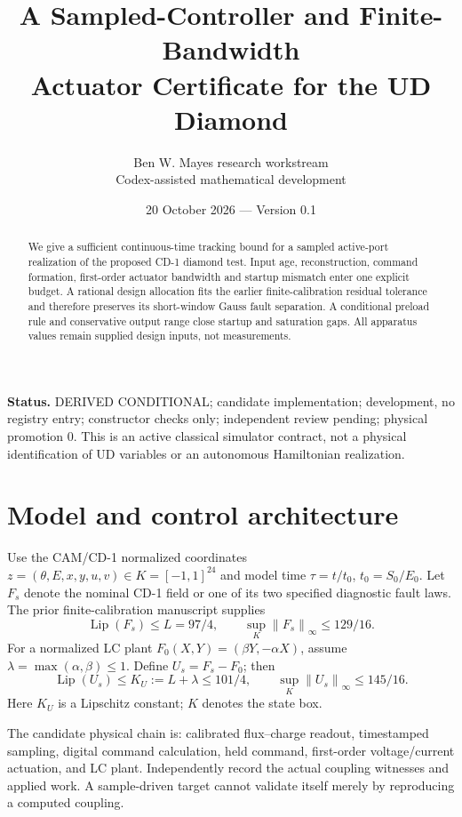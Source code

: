 \documentclass[10pt,a4paper]{article}
\title{A Sampled-Controller and Finite-Bandwidth\\Actuator Certificate for the UD Diamond}
\author{Ben W. Mayes research workstream\\Codex-assisted mathematical development}
\date{20 October 2026 --- Version 0.1}
\newcommand{\norm}[1]{\left\|#1\right\|_\infty}
\begin{document}
\maketitle
\begin{abstract}
We give a sufficient continuous-time tracking bound for a sampled active-port realization of the proposed CD-1 diamond test. Input age, reconstruction, command formation, first-order actuator bandwidth and startup mismatch enter one explicit budget. A rational design allocation fits the earlier finite-calibration residual tolerance and therefore preserves its short-window Gauss fault separation. A conditional preload rule and conservative output range close startup and saturation gaps. All apparatus values remain supplied design inputs, not measurements.
\end{abstract}
\noindent\textbf{Status.} DERIVED CONDITIONAL; candidate implementation; development, no registry entry; constructor checks only; independent review pending; physical promotion 0. This is an active classical simulator contract, not a physical identification of UD variables or an autonomous Hamiltonian realization.

\section{Model and control architecture}
Use the CAM/CD-1 normalized coordinates $z=(\theta,E,x,y,u,v)\in K=[-1,1]^{24}$ and model time $\tau=t/t_0$, $t_0=S_0/E_0$. Let $F_s$ denote the nominal CD-1 field or one of its two specified diagnostic fault laws. The prior finite-calibration manuscript supplies
\begin{equation}
\operatorname{Lip}(F_s)\leq L=97/4,\qquad
\sup_K\norm{F_s}\leq129/16 .
\end{equation}
For a normalized LC plant $F_0(X,Y)=(\beta Y,-\alpha X)$, assume
$\lambda=\max(\alpha,\beta)\leq1$. Define $U_s=F_s-F_0$; then
\begin{equation}
\operatorname{Lip}(U_s)\leq K_U:=L+\lambda\leq101/4,
\qquad \sup_K\norm{U_s}\leq145/16 .
\end{equation}
Here $K_U$ is a Lipschitz constant; $K$ denotes the state box.

The candidate physical chain is: calibrated flux--charge readout, timestamped sampling, digital command calculation, held command, first-order voltage/current actuation, and LC plant. Independently record the actual coupling witnesses and applied work. A sample-driven target cannot validate itself merely by reproducing a computed coupling.
\end{document}
